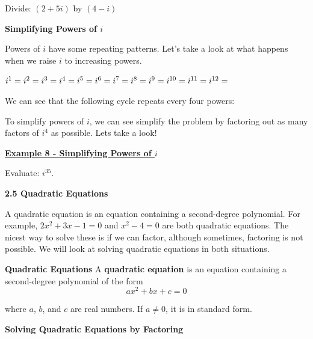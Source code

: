 \documentclass[12pt]{book}
\begin{document}
Divide: $(2+5i)$ by $(4-i)$

\vspace{50mm}

{\large \textbf{Simplifying Powers of $i$}}

Powers of $i$ have some repeating patterns. Let's take a look at what happens when we raise $i$ to increasing powers. 
\begin{multicols}{3}
  $i^1 = \\
    i^2 = \\
    i^3 = \\
    i^4 = \\
    i^5 = \\
    i^6 = \\
    i^7 = \\
    i^8 = \\
    i^9 = \\
    i^{10} = \\
    i^{11} = \\ 
    i^{12} = 
$
\end{multicols}

\vspace{3mm}
We can see that the following cycle repeats every four powers: 

\vspace{3mm}

To simplify powers of $i$, we can see simplify the problem by factoring out as many factors of $i^4$ as possible. Lets take a look!
\newpage

\underline{\textbf{Example 8 - Simplifying Powers of $i$}}

Evaluate: $i^{35}$.

\newpage
\textbf{{\Large 2.5 Quadratic Equations}}
\vspace{5mm}

A quadratic equation is an equation containing a second-degree polynomial. For example, $2x^2+3x-1 = 0$ and $x^2-4=0$ are both quadratic equations. The nicest way to solve these is if we can factor, although sometimes, factoring is not possible. We will look at solving quadratic equations in both situations.

\vspace{3mm}
  \begin{boxR}
     \textbf{Quadratic Equations}
    \vspace{1mm}
    \hline
    \vspace{2mm}
A \textbf{quadratic equation} is an equation containing a second-degree polynomial of the form $$ax^2+bx+c=0$$
 
where $a$, $b$, and $c$ are real numbers. If $a \neq 0$, it is in standard form.
\end{boxR}
\vspace{3mm}
{\large \textbf{Solving Quadratic Equations by Factoring}}
\end{document}
